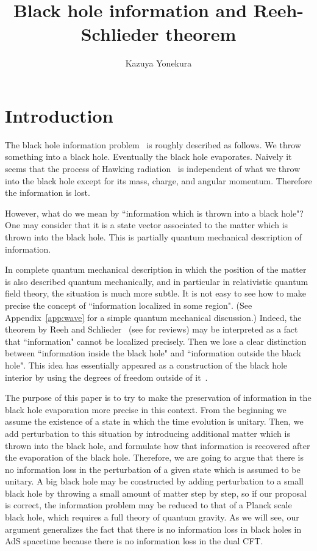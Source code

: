 \documentclass[12pt,a4paper]{article}
\title{ Black hole information and
Reeh-Schlieder theorem
}
\author{Kazuya Yonekura}
\affiliation{Faculty of Arts and Science, Kyushu University, 
 Fukuoka, Fukuoka, 819-0395, Japan
}
\theoremstyle{plain}
\theoremstyle{definition}
\numberwithin{thm}{section}
\begin{document}
\maketitle
\section{Introduction}
The black hole information problem~\cite{Hawking:1976ra} is roughly described as follows.
We throw something into a black hole. Eventually the black hole evaporates. Naively it seems that
the process of Hawking radiation~\cite{Hawking:1974sw} is independent of what we throw into the black hole except for
its mass, charge, and angular momentum. Therefore the information is lost. 

However, what do we mean by ``information which is thrown into a black hole"? One may consider that it is a state vector associated to the matter which is thrown into the black hole.
This is partially quantum mechanical description of information.

In complete quantum mechanical description in which the position of the matter is also described quantum mechanically, and in particular in
relativistic quantum field theory, the situation is much more subtle.
It is not easy to see how to make precise the concept of ``information localized in some region". 
(See Appendix~\ref{app:wave} for a simple quantum mechanical discussion.)
Indeed, the theorem by Reeh and Schlieder~\cite{RS} (see \cite{Streater:1989vi,Witten:2018zxz} for reviews) may be interpreted as a fact that ``information" cannot be
localized precisely. Then we lose a clear distinction between ``information inside the black hole" and ``information outside the black hole".
This idea has essentially appeared as a construction of the black hole interior 
by using the degrees of freedom outside of it~\cite{Papadodimas:2013wnh,Papadodimas:2013jku,Verlinde:2013qya}.

The purpose of this paper is to try to make the  preservation of information in the black hole evaporation more precise in this context.
From the beginning we assume the existence of a state in which the time evolution is unitary.
Then, we add perturbation to this situation by introducing additional matter which is thrown into the black hole, and formulate how that information is recovered 
after the evaporation of the black hole. Therefore, we are going to argue that there is no information loss in the perturbation of a given state which is assumed to be unitary.
A big black hole may be constructed by adding perturbation to a small black hole by throwing a small amount of matter step by step, 
so if our proposal is correct, the information problem may be reduced to that of a Planck scale black hole, which requires a full theory of quantum gravity.
As we will see, our argument generalizes the fact that there is no information loss in black holes in AdS spacetime because there is no information loss in the dual CFT.
\end{document}
